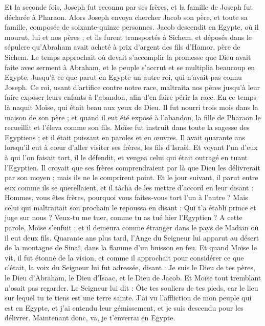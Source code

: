 \begin{multicols}{2}
Et la seconde fois, Joseph fut reconnu par ses frères, et la famille de Joseph fut déclarée à Pharaon.
Alors Joseph envoya chercher Jacob son père, et toute sa famille, composée de soixante-quinze personnes.
Jacob descendit en Egypte, où il mourut, lui et nos pères ;
et ils furent transportés à Sichem, et déposés dans le sépulcre qu'Abraham avait acheté à prix d'argent des fils d’Hamor, père de Sichem.
Le temps approchait où devait s’accomplir la promesse que Dieu avait faite avec serment à Abraham, et le peuple s’accrut et se multiplia beaucoup en Egypte.
Jusqu'à ce que parut en Egypte un autre roi, qui n'avait pas connu Joseph.
Ce roi, usant d’artifice contre notre race, maltraita nos pères jusqu'à leur faire exposer leurs enfants à l'abandon, afin d'en faire périr la race.
En ce temps-là naquit Moïse, qui était beau aux yeux de Dieu. Il fut nourri trois mois dans la maison de son père ;
et quand il eut été exposé à l'abandon, la fille de Pharaon le recueillit et l’éleva comme son fils.
Moïse fut instruit dans toute la sagesse des Egyptiens ; et il était puissant en paroles et en œuvres.
Il avait quarante ans lorsqu’il eut à cœur d'aller visiter ses frères, les fils d'Israël.
Et voyant l’un d’eux à qui l’on faisait tort, il le défendit, et vengea celui qui était outragé en tuant l'Egyptien.
Il croyait que ses frères comprendraient par là que Dieu les délivrerait par son moyen ; mais ils ne le comprirent point.
Et le jour suivant, il parut entre eux comme ils se querellaient, et il tâcha de les mettre d'accord en leur disant : Hommes, vous êtes frères, pourquoi vous faites-vous tort l'un à l'autre ?
Mais celui qui maltraitait son prochain le repoussa en disant : Qui t'a établi prince et juge sur nous ?
Veux-tu me tuer, comme tu as tué hier l'Egyptien ?
A cette parole, Moïse s'enfuit ; et il demeura comme étranger dans le pays de Madian où il eut deux fils.
Quarante ans plus tard, l'Ange du Seigneur lui apparut au désert de la montagne de Sinaï, dans la flamme d’un buisson en feu.
Et quand Moïse le vit, il fut étonné de la vision, et comme il approchait pour considérer ce que c'était, la voix du Seigneur lui fut adressée,
disant : Je suis le Dieu de tes pères, le Dieu d'Abraham, le Dieu d'Isaac, et le Dieu de Jacob. Et Moïse tout tremblant n'osait pas regarder.
Le Seigneur lui dit : Ôte tes souliers de tes pieds, car le lieu sur lequel tu te tiens est une terre sainte.
J'ai vu l'affliction de mon peuple qui est en Egypte, et j'ai entendu leur gémissement, et je suis descendu pour les délivrer. Maintenant donc, va, je t'enverrai en Egypte.

\end{multicols}
